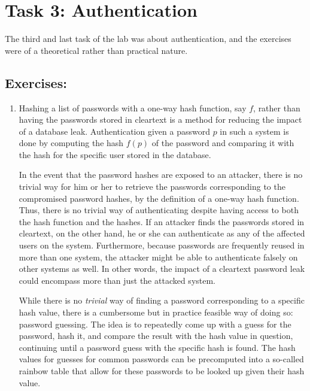 \section*{Task 3: Authentication}
The third and last task of the lab was about authentication, and the exercises were of a theoretical rather than practical nature.
\subsection*{Exercises:}
\begin{enumerate}
\item %

Hashing a list of passwords with a one-way hash function, say $f$, rather than having the passwords stored in cleartext is a method for reducing the impact of a database leak. Authentication given a password $p$ in such a system is done by computing the hash $f(p)$ of the password and comparing it with the hash for the specific user stored in the database.

In the event that the password hashes are exposed to an attacker, there is no trivial way for him or her to retrieve the passwords corresponding to the compromised password hashes, by the definition of a one-way hash function. Thus, there is no trivial way of authenticating despite having access to both the hash function and the hashes. If an attacker finds the passwords stored in cleartext, on the other hand, he or she can authenticate as any of the affected users on the system. Furthermore, because passwords are frequently reused in more than one system, the attacker might be able to authenticate falsely on other systems as well. In other words, the impact of a cleartext password leak could encompass more than just the attacked system.

While there is no \emph{trivial} way of finding a password corresponding to a specific hash value, there is a cumbersome but in practice feasible way of doing so: password guessing\cite{book:passwordGuessing}. The idea is to repeatedly come up with a guess for the password, hash it, and compare the result with the hash value in question, continuing until a password guess with the specific hash is found. The hash values for guesses for common passwords can be precomputed into a so-called rainbow table\cite{website:wikipedia_rainbowtable} that allow for these passwords to be looked up given their hash value.


\end{enumerate}
